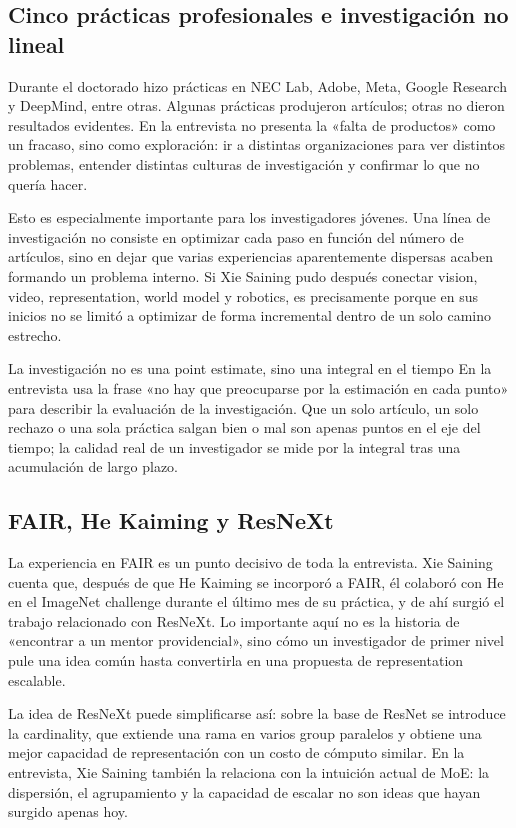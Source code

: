 \documentclass[a4paper]{article}
\begin{document}
\subsection{Cinco prácticas profesionales e investigación no lineal}

Durante el doctorado hizo prácticas en NEC Lab, Adobe, Meta, Google Research y DeepMind, entre otras. Algunas prácticas produjeron artículos; otras no dieron resultados evidentes. En la entrevista no presenta la «falta de productos» como un fracaso, sino como exploración: ir a distintas organizaciones para ver distintos problemas, entender distintas culturas de investigación y confirmar lo que no quería hacer.

Esto es especialmente importante para los investigadores jóvenes. Una línea de investigación no consiste en optimizar cada paso en función del número de artículos, sino en dejar que varias experiencias aparentemente dispersas acaben formando un problema interno. Si Xie Saining pudo después conectar vision, video, representation, world model y robotics, es precisamente porque en sus inicios no se limitó a optimizar de forma incremental dentro de un solo camino estrecho.

\begin{importantbox}{La investigación no es una point estimate, sino una integral en el tiempo}
En la entrevista usa la frase «no hay que preocuparse por la estimación en cada punto» para describir la evaluación de la investigación. Que un solo artículo, un solo rechazo o una sola práctica salgan bien o mal son apenas puntos en el eje del tiempo; la calidad real de un investigador se mide por la integral tras una acumulación de largo plazo.
\end{importantbox}

\subsection{FAIR, He Kaiming y ResNeXt}

La experiencia en FAIR es un punto decisivo de toda la entrevista. Xie Saining cuenta que, después de que He Kaiming se incorporó a FAIR, él colaboró con He en el ImageNet challenge durante el último mes de su práctica, y de ahí surgió el trabajo relacionado con ResNeXt. Lo importante aquí no es la historia de «encontrar a un mentor providencial», sino cómo un investigador de primer nivel pule una idea común hasta convertirla en una propuesta de representation escalable.

La idea de ResNeXt puede simplificarse así: sobre la base de ResNet se introduce la cardinality, que extiende una rama en varios group paralelos y obtiene una mejor capacidad de representación con un costo de cómputo similar. En la entrevista, Xie Saining también la relaciona con la intuición actual de MoE: la dispersión, el agrupamiento y la capacidad de escalar no son ideas que hayan surgido apenas hoy.
\end{document}
